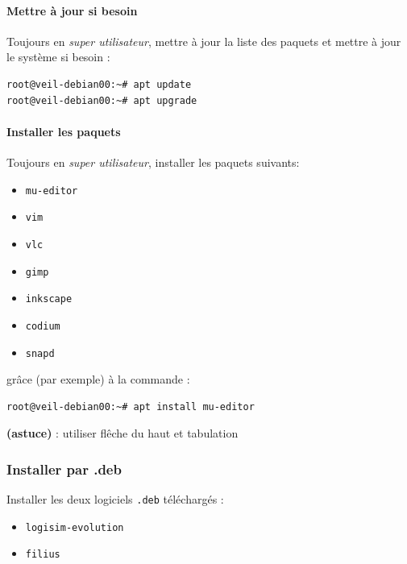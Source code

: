 \documentclass[11pt]{article}
\providecommand{\tightlist}{%
      \setlength{\itemsep}{0pt}\setlength{\parskip}{0pt}}
\begin{document}
    \hypertarget{mettre-uxe0-jour-si-besoin}{%
\paragraph{Mettre à jour si besoin}\label{mettre-uxe0-jour-si-besoin}}

Toujours en \emph{super utilisateur}, mettre à jour la liste des paquets
et mettre à jour le système si besoin :

\begin{verbatim}
root@veil-debian00:~# apt update
root@veil-debian00:~# apt upgrade
\end{verbatim}

    \hypertarget{installer-les-paquets}{%
\paragraph{Installer les paquets}\label{installer-les-paquets}}

    Toujours en \emph{super utilisateur}, installer les paquets suivants:

\begin{itemize}
\tightlist
\item
  \texttt{mu-editor}
\item
  \texttt{vim}
\item
  \texttt{vlc}
\item
  \texttt{gimp}
\item
  \texttt{inkscape}
\item
  \texttt{codium}
\item
  \texttt{snapd}
\end{itemize}

grâce (par exemple) à la commande :

\begin{verbatim}
root@veil-debian00:~# apt install mu-editor
\end{verbatim}

\textbf{(astuce)} : utiliser %
  flêche du haut et tabulation%

    \hypertarget{installer-par-.deb}{%
\subsubsection{Installer par .deb}\label{installer-par-.deb}}

    Installer les deux logiciels \texttt{.deb} téléchargés :

\begin{itemize}
\tightlist
\item
  \texttt{logisim-evolution}
\item
  \texttt{filius}
\end{itemize}
\end{document}
